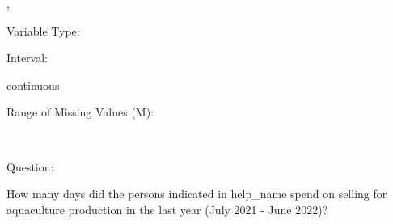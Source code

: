 \documentclass[
]{article}
\begin{document}
,

\begin{minipage}[t]{0.3\linewidth}

\colorbox{mypink1}{}

\end{minipage}%
\begin{minipage}[t]{0.7\linewidth}

\colorbox{mypink1}{\makebox[\textwidth]{\strut\bfseries\color{black}  
 }}

\end{minipage}

\begin{minipage}[t]{0.3\linewidth}

Variable Type:

\end{minipage}%
\begin{minipage}[t]{0.7\linewidth}

\end{minipage}

\begin{minipage}[t]{0.3\linewidth}

Interval:

\end{minipage}%
\begin{minipage}[t]{0.7\linewidth}

continuous

\end{minipage}

\begin{minipage}[t]{0.3\linewidth}

Range of Missing Values (M):

\end{minipage}%
\begin{minipage}[t]{0.7\linewidth}

~

\end{minipage}

\begin{minipage}[t]{0.3\linewidth}

Question:

\end{minipage}%
\begin{minipage}[t]{0.7\linewidth}

How many days did the persons indicated in help\_name spend on selling
for aquaculture production in the last year (July 2021 - June 2022)?

\end{minipage}
\end{document}
